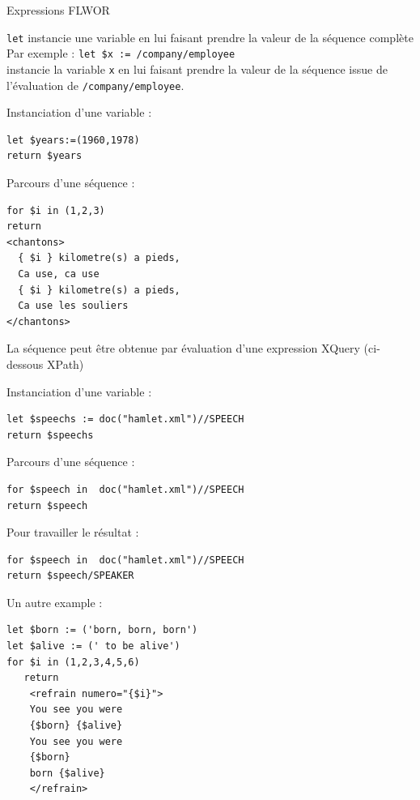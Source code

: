 \begin{frame}{Expressions FLWOR }
\bigskip

\lstinline!let! instancie une variable en lui faisant prendre la valeur de la séquence complète\\
\medskip
 Par exemple : \lstinline!let $x := /company/employee!\\
instancie la variable \lstinline!x! en lui faisant prendre la valeur de \alert{la séquence} issue 
de l'évaluation de \lstinline!/company/employee!.

\framebreak

Instanciation d'une variable :
\begin{lstlisting}
let $years:=(1960,1978)
return $years
\end{lstlisting}


Parcours d'une séquence :
\begin{lstlisting}
for $i in (1,2,3)
return 
<chantons>
  { $i } kilometre(s) a pieds,
  Ca use, ca use
  { $i } kilometre(s) a pieds,
  Ca use les souliers
</chantons>
\end{lstlisting}
 
\framebreak

La séquence peut être obtenue par évaluation d'une expression XQuery (ci-dessous XPath)

\bigskip

Instanciation d'une variable :
\begin{lstlisting}
let $speechs := doc("hamlet.xml")//SPEECH
return $speechs
\end{lstlisting}

\bigskip

Parcours d'une séquence :
\begin{lstlisting}
for $speech in  doc("hamlet.xml")//SPEECH
return $speech
\end{lstlisting}


\bigskip
Pour travailler le résultat :

\begin{lstlisting}
for $speech in  doc("hamlet.xml")//SPEECH
return $speech/SPEAKER
\end{lstlisting}

\framebreak

Un autre example :

\begin{lstlisting}
let $born := ('born, born, born')
let $alive := (' to be alive')
for $i in (1,2,3,4,5,6)
   return 
	<refrain numero="{$i}">
	You see you were
	{$born} {$alive}
	You see you were
	{$born}
	born {$alive}
	</refrain>
\end{lstlisting}


\end{frame}
